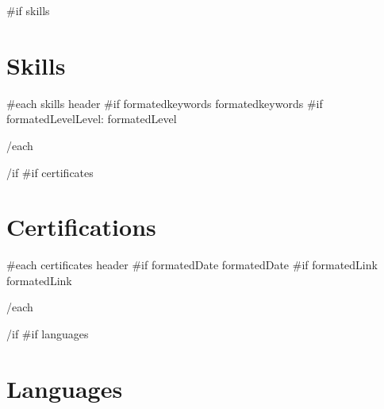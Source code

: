 \documentclass{article}
{{ markdownPackage }}
\begin{document}
\color{primary-950}

\begin{paracol}{2}
\begin{leftcolumn*}
\titleformat{\section}{\color{accent}\raggedright\normalsize\bfseries\uppercase}{}{0ex}{}
\titlespacing{\section}{0ex}{0.75ex}{0.75ex}
{{#if skills}}\section*{Skills}{
  {{#each skills}}
    {{ header }}\newline
    {{#if formatedkeywords}}{{ formatedkeywords }}
    {{#if formatedLevel}}Level: {{ formatedLevel }}
    \par
  {{/each}}
}{{/if}}
{{#if certificates}}\section*{Certifications}{
  {{#each certificates}}
    {{ header }}\newline
    {{#if formatedDate}}{{ formatedDate }}
    {{#if formatedLink}}{{ formatedLink }}
    \par
  {{/each}}
}{{/if}}
{{#if languages}}\section*{Languages}{
}
\end{leftcolumn*}
\end{paracol}
\end{document}
